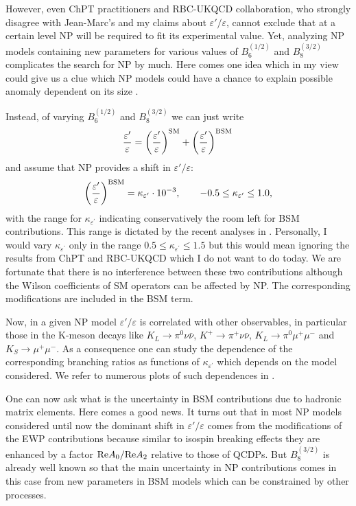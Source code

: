 \documentclass[12pt,a4paper]{article}
\newcommand{\RE}{{\rm Re}}
\newcommand{\bsi}{B_6^{(1/2)}}
\newcommand{\bei}{B_8^{(3/2)}}
\def\epe{\varepsilon'/\varepsilon}
\newcommand{\be}{\begin{equation}}
\newcommand{\ee}{\end{equation}}
\def\kpn{K^+\rightarrow\pi^+\nu\bar\nu}
\def\klpn{K_{L}\rightarrow\pi^0\nu\bar\nu}
\newcommand{\kepe}{\kappa_{\varepsilon^\prime}}
\begin{document}
However, even ChPT practitioners and RBC-UKQCD
collaboration, who strongly disagree with Jean-Marc's and my claims
about $\epe$, cannot exclude that at a certain level NP will be required to fit its
experimental value. Yet, analyzing NP models containing  new parameters for various values of $\bsi$ and $\bei$ complicates the search for NP  by much. Here comes
one idea which in my view could give us a clue which NP models could have a chance to explain possible anomaly dependent on its size  \cite{Buras:2015jaq}.

Instead, of varying $\bsi$ and $\bei$ we can just write
\be\label{GENERAL}
\frac{\varepsilon'}{\varepsilon}=\left(\frac{\varepsilon'}{\varepsilon}\right)^{\rm SM}+\left(\frac{\varepsilon'}{\varepsilon}\right)^{\rm BSM}\,
\ee
and assume
that NP provides a  shift in $\epe$:
\be\label{deltaeps}
\left(\frac{\varepsilon'}{\varepsilon}\right)^{\rm BSM}= \kepe\cdot 10^{-3}, \qquad   -0.5 \le \kepe \le 1.0,
\ee
with the range for $\kepe$ indicating conservatively the room left for BSM contributions. This range is dictated by the recent analyses in \cite{Buras:2020pjp,Aebischer:2020jto}. Personally, I would vary $\kepe$ only in the range
$0.5\le \kepe \le 1.5$ but this would mean ignoring the results from ChPT and RBC-UKQCD which I do not want to do today. We are fortunate that there is no interference between these two contributions although the Wilson coefficients of SM
 operators can be affected by NP. The corresponding modifications are included in the BSM term.

Now, in a given NP model $\epe$ is correlated with other observables, in particular those in the K-meson decays like $\klpn$, $\kpn$, $K_{L}\rightarrow\pi^0\mu^+\mu^-$ and $K_{S}\rightarrow\mu^+\mu^-$.
As a consequence
one can study the dependence of the corresponding branching ratios as functions
of $\kepe$  which depends on the model considered. We refer to numerous plots
of such dependences in  \cite{Buras:2015jaq,Aebischer:2020mkv}.

One can now ask what is the uncertainty in BSM contributions due to hadronic
matrix elements. Here comes a good news. It turns out that in most
NP models considered until now the dominant shift in $\epe$ comes from the
modifications of the EWP contributions because similar
to isospin breaking effects they are enhanced by a factor ${\RE A_0/\RE A_2}$
relative to those of QCDPs. But $\bei$ is already well known
so that the main uncertainty in NP contributions comes in this case from new parameters in BSM models which can be constrained by other processes.
\end{document}
